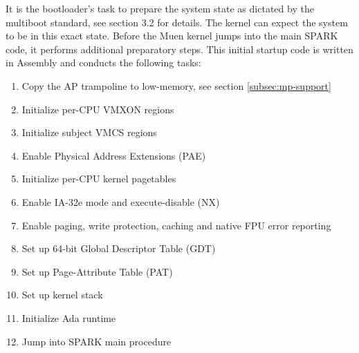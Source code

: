 It is the bootloader's task to prepare the system state as dictated by the
multiboot standard, see \cite{multiboot} section 3.2 for details. The kernel
can expect the system to be in this exact state. Before the Muen kernel jumps
into the main SPARK code, it performs additional preparatory steps. This
initial startup code is written in Assembly and conducts the following tasks:

\begin{enumerate}
	\item Copy the AP trampoline to low-memory, see section
		\ref{subsec:mp-support} \item Initialize per-CPU VMXON regions
	\item Initialize subject VMCS regions
	\item Enable Physical Address Extensions (PAE)
	\item Initialize per-CPU kernel pagetables
	\item Enable IA-32e mode and execute-disable (NX)
	\item Enable paging, write protection, caching and native FPU error
		reporting
	\item Set up 64-bit Global Descriptor Table (GDT)
	\item Set up Page-Attribute Table (PAT)
	\item Set up kernel stack
	\item Initialize Ada runtime
	\item Jump into SPARK main procedure
\end{enumerate}
